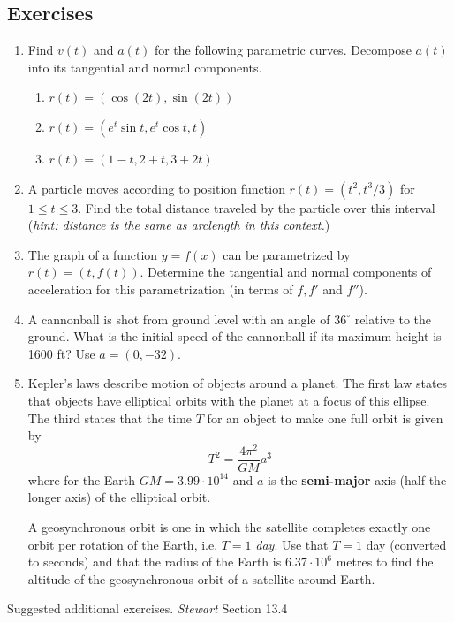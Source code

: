 \documentclass[12pt]{article}
\numberwithin{equation}{subsection}
\numberwithin{figure}{subsection}
\theoremstyle{note}
\begin{document}
{\subsection{Exercises}  
\begin{enumerate}[label=\arabic*.]

\item Find  $v(t)$ and $a(t)$ for the following parametric curves. Decompose $a(t)$ into its tangential and normal components. 
\begin{enumerate}
	\item $r(t)=(\cos(2t), \sin(2t))$
	\item $r(t)=(e^t \sin t, e^t \cos t, t)$
	\item $r(t)=(1-t, 2+t, 3+2t)$
\end{enumerate} 

\item A particle moves according to position function $r(t)=(t^2, t^3/3)$ for $1\leq t\leq 3$. Find the total distance traveled by the particle over this interval (\textit{hint: distance is the same as arclength in this context.})

\item The graph of a function $y=f(x)$ can be parametrized by $r(t)=(t,f(t))$. Determine the tangential and normal components of acceleration for this parametrization (in terms of $f, f'$ and $f''$).

\item A cannonball is shot from ground level with an angle of $36^{\circ}$ relative to the ground. What is the initial speed of the cannonball if its maximum height is 1600 ft? Use $a=(0, -32)$. 

\item Kepler's laws describe motion of objects around a planet. The first law states that objects have elliptical orbits with the planet at a focus of this ellipse. The third states that the time $T$ for an object to make one full orbit is given by \[ T^2=\dfrac{4\pi^2}{GM}a^3\] where for the Earth $GM=3.99\cdot 10^{14}$ and $a$ is the \textbf{semi-major} axis (half the longer axis) of the elliptical orbit. 

A geosynchronous orbit is one in which the satellite completes exactly one orbit per rotation of the Earth, i.e. $T=1$ \textit{day}. Use that $T=1$ day (converted to seconds) and that the radius of the Earth is $6.37\cdot 10^{6}$ metres to find the altitude of the geosynchronous orbit of a satellite around Earth. 

\end{enumerate}
Suggested additional exercises. \textit{Stewart} Section 13.4



}
\end{document}
